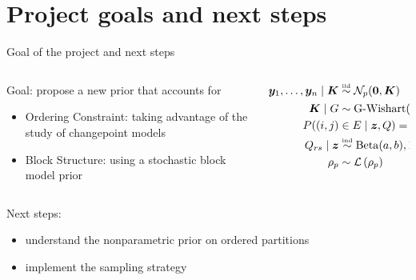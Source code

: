 \section{Project goals and next steps}
\begin{frame}{Goal of the project and next steps}

\vspace*{0.5cm}
\begin{columns}

    \begin{column}{0.4\textwidth}
        \alert{Goal:} propose a \alert{new prior} that accounts for
        \begin{itemize}
            \item Ordering Constraint: taking advantage of the study of changepoint models
            \item Block Structure: using a stochastic block model prior
        \end{itemize}
    \end{column}
    \begin{column}{0.6\textwidth}
        \begin{align*}
        \bm{y}_1, \ldots, \bm{y}_n \mid \bm{K} & \overset{\text{\tiny{iid}}}{\sim} \mathcal{N}_p(\mathbf{0}, \bm{K}) \\
        \bm{K} \mid G & \sim \operatorname{G-Wishart}(b, D), \bm{K} \in \mathbb{R}^{p \times p} \\
        P((i,j)&\in E\mid \bm{z},Q) = Q_{z_{i} z_{j}}\\
            Q_{rs} \mid \bm{z} &\overset{\text{\tiny{ind}}}{\sim} \operatorname{Beta}(a,b), 1\leq r\leq s\leq H\\
        \rho_p & \sim \mathcal{L}\left(\rho_p\right)
        \end{align*}  
    \end{column}
\end{columns}
\vspace*{0.5cm}


\alert{Next steps:}
\begin{itemize}
\item understand the nonparametric prior on ordered partitions
\item implement the sampling strategy
\end{itemize}

\end{frame}

